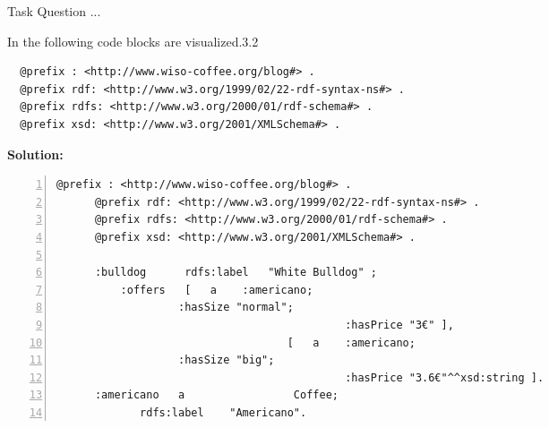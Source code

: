 \newpage
\begin{task}{Task Question ...}{}{}{}{}{}
	\begin{subtask}{6}{In the following code blocks are visualized.}{3.2}{}{}{}{}
		\begin{problem}
    		\begin{Verbatim}
  @prefix : <http://www.wiso-coffee.org/blog#> .
  @prefix rdf: <http://www.w3.org/1999/02/22-rdf-syntax-ns#> .
  @prefix rdfs: <http://www.w3.org/2000/01/rdf-schema#> .
  @prefix xsd: <http://www.w3.org/2001/XMLSchema#> .
			\end{Verbatim}
		\end{problem}
			
		\begin{solution}
			\textbf{Solution:}
            \begin{Verbatim}[frame=single, numbers=left, fontsize=\footnotesize]
      @prefix : <http://www.wiso-coffee.org/blog#> .
      @prefix rdf: <http://www.w3.org/1999/02/22-rdf-syntax-ns#> .
      @prefix rdfs: <http://www.w3.org/2000/01/rdf-schema#> .
      @prefix xsd: <http://www.w3.org/2001/XMLSchema#> .
      
      :bulldog      rdfs:label   "White Bulldog" ;
		  :offers	[   a    :americano;
				   :hasSize "normal";
                                             :hasPrice "3€" ],
                              		[   a    :americano;
				   :hasSize "big";
                                             :hasPrice "3.6€"^^xsd:string ].
      :americano   a                 Coffee;
		     rdfs:label    "Americano".
            \end{Verbatim}
		\end{solution}
	\end{subtask}
\end{task}